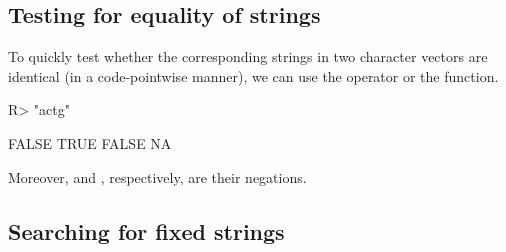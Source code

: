 \documentclass[nojss]{jss}
\begin{document}
\subsection{Testing for equality of strings}



To quickly test whether the corresponding strings in two character vectors
are identical (in a code-pointwise manner), we can use the 
operator or the  function.

\begin{Schunk}
\begin{Sinput}
R> "actg" %s===% c("ACTG", "actg", "act", NA)  # recycling rule, etc.
\end{Sinput}
\begin{Soutput}
[1] FALSE  TRUE FALSE    NA
\end{Soutput}
\end{Schunk}

Moreover,  and , respectively,
are their negations.


\subsection{Searching for fixed strings}
\end{document}
